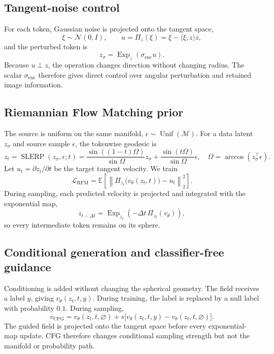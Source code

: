 \documentclass{article}
\begin{document}
\subsection{Tangent-noise control}
For each token, Gaussian noise is projected onto the tangent space,
\begin{equation}
 \xi\sim\mathcal N(0,I),\qquad
 u=\Pi_z(\xi)=\xi-\langle\xi,z\rangle z,
\end{equation}
and the perturbed token is
\begin{equation}
 z_\sigma=\operatorname{Exp}_z(\sigma_{\mathrm{enc}}u).
\label{eq:noise}
\end{equation}
Because $u\perp z$, the operation changes direction without changing radius. The scalar $\sigma_{\mathrm{enc}}$ therefore gives direct control over angular perturbation and retained image information.

\subsection{Riemannian Flow Matching prior}
The source is uniform on the same manifold, $\epsilon\sim\operatorname{Unif}(\mathcal M)$. For a data latent $z_\sigma$ and source sample $\epsilon$, the tokenwise geodesic is
\begin{equation}
 z_t=\operatorname{SLERP}(z_\sigma,\epsilon;t)
 =\frac{\sin((1-t)\Omega)}{\sin\Omega}z_\sigma
 +\frac{\sin(t\Omega)}{\sin\Omega}\epsilon,
\quad \Omega=\arccos(z_\sigma^\top\epsilon).
\label{eq:slerp}
\end{equation}
Let $u_t=\partial z_t/\partial t$ be the target tangent velocity. We train
\begin{equation}
 \mathcal L_{\mathrm{RFM}}
 =\mathbb E\!\left[\left\|\Pi_{z_t}\big(v_\theta(z_t,t)\big)-u_t\right\|_2^2\right].
\label{eq:rfm}
\end{equation}
During sampling, each predicted velocity is projected and integrated with the exponential map,
\begin{equation}
 z_{t-\Delta t}=\operatorname{Exp}_{z_t}\!\left(-\Delta t\,\Pi_{z_t}(v_\theta)\right),
\label{eq:sample}
\end{equation}
so every intermediate token remains on its sphere.

\subsection{Conditional generation and classifier-free guidance}
Conditioning is added without changing the spherical geometry. The field receives a label $y$, giving $v_\theta(z_t,t,y)$. During training, the label is replaced by a null label with probability $0.1$. During sampling,
\begin{equation}
 v_{\mathrm{CFG}}=v_\theta(z_t,t,\varnothing)
+s\big[v_\theta(z_t,t,y)-v_\theta(z_t,t,\varnothing)\big].
\label{eq:cfg}
\end{equation}
The guided field is projected onto the tangent space before every exponential-map update. CFG therefore changes conditional sampling strength but not the manifold or probability path.
\end{document}
